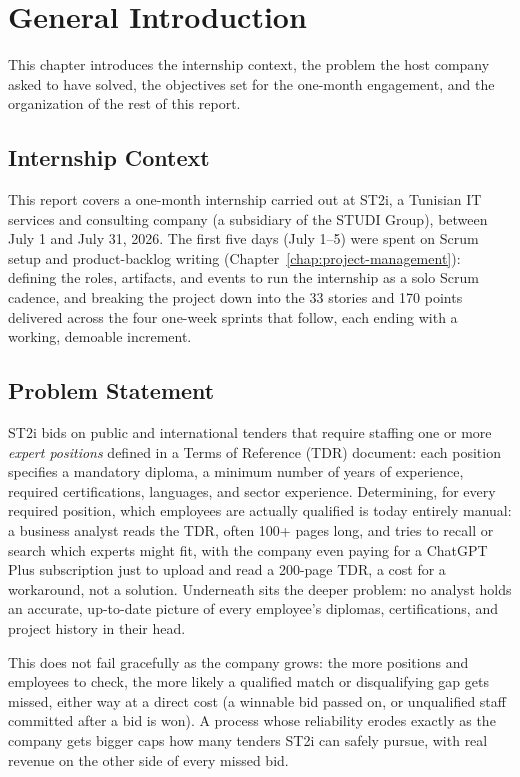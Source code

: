 \chapter{General Introduction}
\enlargethispage{2\baselineskip}

This chapter introduces the internship context, the problem the host company
asked to have solved, the objectives set for the one-month engagement, and
the organization of the rest of this report.

\section{Internship Context}

This report covers a one-month internship carried out at ST2i, a Tunisian IT
services and consulting company (a subsidiary of the STUDI Group), between
July 1 and July 31, 2026. The first five days (July 1--5) were spent on
Scrum setup and product-backlog writing (Chapter~\ref{chap:project-management}):
defining the roles, artifacts, and events to run the internship as a solo
Scrum cadence, and breaking the project down into the 33 stories and 170
points delivered across the four one-week sprints that follow, each ending
with a working, demoable increment.

\section{Problem Statement}

ST2i bids on public and international tenders that require staffing one or
more \textit{expert positions} defined in a Terms of Reference (TDR)
document: each position specifies a mandatory diploma, a minimum number of
years of experience, required certifications, languages, and sector
experience. Determining, for every required position, which employees are
actually qualified is today entirely manual: a business analyst reads the
TDR, often 100+ pages long, and tries to recall or search which experts
might fit, with the company even paying for a ChatGPT Plus subscription
just to upload and read a 200-page TDR, a cost for a workaround, not a
solution. Underneath sits the deeper problem: no analyst holds an accurate,
up-to-date picture of every employee's diplomas, certifications, and
project history in their head.

This does not fail gracefully as the company grows: the more positions and
employees to check, the more likely a qualified match or disqualifying gap
gets missed, either way at a direct cost (a winnable bid passed on, or
unqualified staff committed after a bid is won). A process whose
reliability erodes exactly as the company gets bigger caps how many
tenders ST2i can safely pursue, with real revenue on the other side of
every missed bid.

